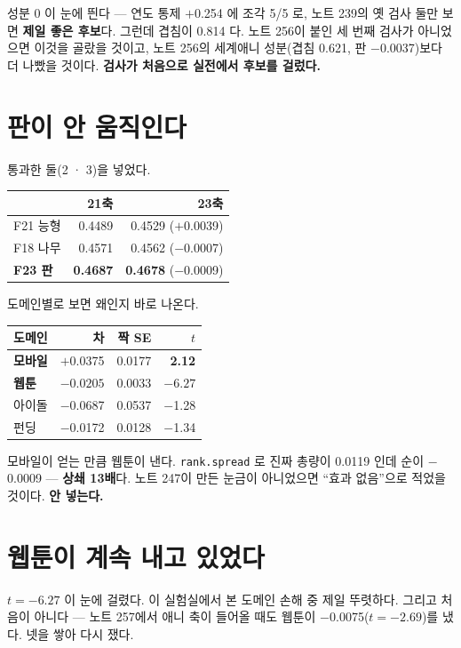 \documentclass[10pt]{article}
\begin{document}
성분 0 이 눈에 띈다 --- 연도 통제 $+$0.254 에 조각 5/5 로, 노트 239의 옛
검사 둘만 보면 \textbf{제일 좋은 후보}다. 그런데 겹침이 0.814 다. 노트 256이
붙인 세 번째 검사가 아니었으면 이것을 골랐을 것이고, 노트 256의 세계애니
성분(겹침 0.621, 판 $-$0.0037)보다 더 나빴을 것이다. \textbf{검사가 처음으로
실전에서 후보를 걸렀다.}

\section{판이 안 움직인다}

통과한 둘(2 · 3)을 넣었다.

\begin{center}\small
\begin{tabular}{lrr}
\hline
 & 21축 & 23축 \\
\hline
F21 능형 & 0.4489 & 0.4529 ($+$0.0039) \\
F18 나무 & 0.4571 & 0.4562 ($-$0.0007) \\
\textbf{F23 판} & \textbf{0.4687} & \textbf{0.4678} ($-$0.0009) \\
\hline
\end{tabular}
\end{center}

도메인별로 보면 왜인지 바로 나온다.

\begin{center}\small
\begin{tabular}{lrrr}
\hline
도메인 & 차 & 짝 SE & $t$ \\
\hline
\textbf{모바일} & $+$0.0375 & 0.0177 & \textbf{2.12} \\
\textbf{웹툰} & $\mathbf{-0.0205}$ & 0.0033 & $\mathbf{-6.27}$ \\
아이돌 & $-$0.0687 & 0.0537 & $-$1.28 \\
펀딩 & $-$0.0172 & 0.0128 & $-$1.34 \\
\hline
\end{tabular}
\end{center}

모바일이 얻는 만큼 웹툰이 낸다. \texttt{rank.spread} 로 진짜 총량이 0.0119
인데 순이 $-$0.0009 --- \textbf{상쇄 13배}다. 노트 247이 만든 눈금이
아니었으면 ``효과 없음''으로 적었을 것이다. \textbf{안 넣는다.}

\section{웹툰이 계속 내고 있었다}

$t{=}-6.27$ 이 눈에 걸렸다. 이 실험실에서 본 도메인 손해 중 제일 뚜렷하다.
그리고 처음이 아니다 --- 노트 257에서 애니 축이 들어올 때도 웹툰이
$-$0.0075($t{=}-2.69$)를 냈다. 넷을 쌓아 다시 쟀다.
\end{document}

